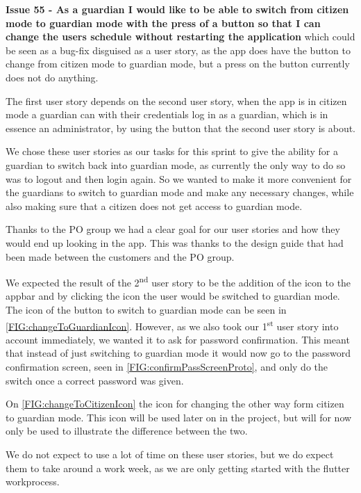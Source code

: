 \textbf{Issue 55 - As a guardian I would like to be able to switch from citizen mode to guardian mode with the press of a button so that I can change the users schedule without restarting the application} which could be seen as a bug-fix disguised as a user story, as the app does have the button to change from citizen mode to guardian mode, but a press on the button currently does not do anything.

The first user story depends on the second user story, when the app is in citizen mode a guardian can with their credentials log in as a guardian, which is in essence an administrator, by using the button that the second user story is about.

We chose these user stories as our tasks for this sprint to give the ability for a guardian to switch back into guardian mode, as currently the only way to do so was to logout and then login again.
So we wanted to make it more convenient for the guardians to switch to guardian mode and make any necessary changes, while also making sure that a citizen does not get access to guardian mode.

Thanks to the PO group we had a clear goal for our user stories and how they would end up looking in the app.
This was thanks to the design guide that had been made between the customers and the PO group.

We expected the result of the 2\textsuperscript{nd} user story to be the addition of the icon to the appbar and by clicking the icon the user would be switched to guardian mode.
The icon of the button to switch to guardian mode can be seen in \autoref{FIG:changeToGuardianIcon}.
However, as we also took our 1\textsuperscript{st} user story into account immediately, we wanted it to ask for password confirmation.
This meant that instead of just switching to guardian mode it would now go to the password confirmation screen, seen in \autoref{FIG:confirmPassScreenProto}, and only do the switch once a correct password was given.


On \autoref{FIG:changeToCitizenIcon} the icon for changing the other way form citizen to guardian mode. 
This icon will be used later on in the project, but will for now only be used to illustrate the difference between the two. 

We do not expect to use a lot of time on these user stories, but we do expect them to take around a work week, as we are only getting started with the flutter workprocess.
